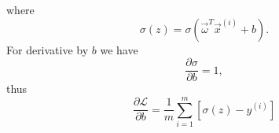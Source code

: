 where
\[
\sigma(z) = \sigma\left(\vec{\omega}^T\vec{x}^{(i)} + b\right).
\]
For derivative by $b$ we have
\[
\frac{\partial \sigma}{\partial b} = 1,
\]
thus
\begin{equation}
 \frac{\partial
   \mathcal{L}}{\partial b} =
  \frac{1}{m} \sum_{i = 1}^{m} \left[ \sigma(z) - y^{(i)} \right]
 \nonumber
\end{equation}

